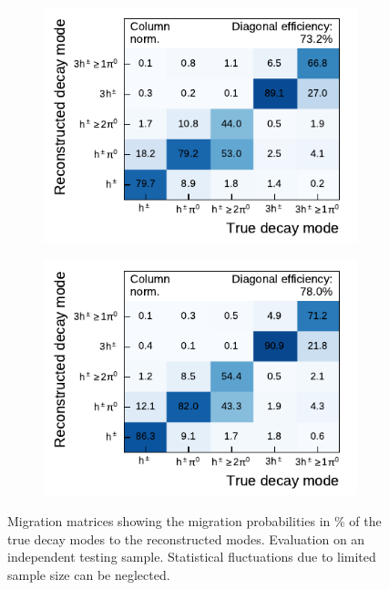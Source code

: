 \begin{figure}[htb]
  \begin{subfigure}[t]{0.48\textwidth}
    \centering
    \includegraphics{./figures/decay_mode_classification/mig_mat_pantau.pdf}
  \end{subfigure}\hfill
  \begin{subfigure}[t]{0.48\textwidth}
    \centering
    \includegraphics{./figures/decay_mode_classification/mig_mat_baseline_ptcut_1_5.pdf}
  \end{subfigure}
  \caption{Migration matrices showing the migration probabilities in
    \si{\percent} of the true decay modes to the reconstructed modes. Evaluation
    on an independent testing sample. Statistical fluctuations due to limited
    sample size can be neglected.}
  \label{fig:migmat_comparison_baseline_15cut}
\end{figure}

